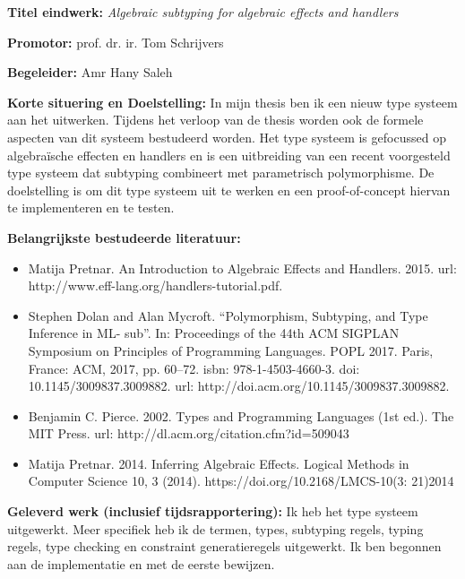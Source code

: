 \documentclass[12pt]{report}
\begin{document}
\pagestyle{myheadings}
{\bf Titel eindwerk:} {\em Algebraic subtyping for algebraic effects and handlers}

\vspace{0.5cm}
{\bf Promotor:} prof. dr. ir. Tom Schrijvers


\vspace{0.5cm}
{\bf Begeleider:} Amr Hany Saleh

\vspace{1cm}
{\bf Korte situering en Doelstelling:} In mijn thesis ben ik een nieuw type systeem aan het uitwerken. Tijdens het verloop van de thesis worden ook de formele aspecten van dit systeem bestudeerd worden. Het type systeem is gefocussed op algebraïsche effecten en handlers en is een uitbreiding van een recent voorgesteld type systeem dat subtyping combineert met parametrisch polymorphisme. De doelstelling is om dit type systeem uit te werken en een proof-of-concept hiervan te implementeren en te testen.

\vspace{1cm}
{\bf Belangrijkste bestudeerde literatuur:}
\begin{itemize}
\item Matija Pretnar. An Introduction to Algebraic Effects and Handlers. 2015. url: http://www.eff-lang.org/handlers-tutorial.pdf.
\item Stephen Dolan and Alan Mycroft. “Polymorphism, Subtyping, and Type Inference in ML- sub”. In: Proceedings of the 44th ACM SIGPLAN Symposium on Principles of Programming Languages. POPL 2017. Paris, France: ACM, 2017, pp. 60–72. isbn: 978-1-4503-4660-3. doi: 10.1145/3009837.3009882. url: http://doi.acm.org/10.1145/3009837.3009882.
\item Benjamin C. Pierce. 2002. Types and Programming Languages (1st ed.). The MIT Press. url: http://dl.acm.org/citation.cfm?id=509043
\item Matija Pretnar. 2014. Inferring Algebraic Effects. Logical Methods in Computer Science 10, 3 (2014). https://doi.org/10.2168/LMCS-10(3: 21)2014
\end{itemize}

\vspace{1cm}
{\bf Geleverd werk (inclusief tijdsrapportering):} Ik heb het type systeem uitgewerkt. Meer specifiek heb ik de termen, types, subtyping regels, typing regels, type checking en constraint generatieregels uitgewerkt. Ik ben begonnen aan de implementatie en met de eerste bewijzen.
\end{document}
